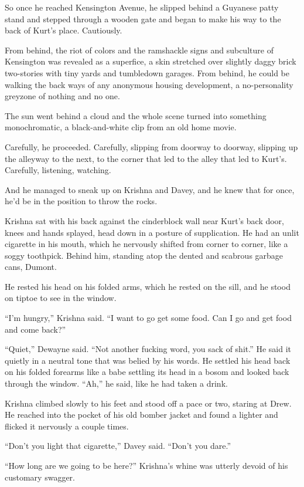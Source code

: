 \documentclass{article}
\begin{document}
So once he reached Kensington Avenue, he slipped behind a Guyanese
patty stand and stepped through a wooden gate and began to make his
way to the back of Kurt's place.  Cautiously.

From behind, the riot of colors and the ramshackle signs and
subculture of Kensington was revealed as a superfice, a skin stretched
over slightly daggy brick two-stories with tiny yards and tumbledown
garages.  From behind, he could be walking the back ways of any
anonymous housing development, a no-personality greyzone of nothing
and no one.

The sun went behind a cloud and the whole scene turned into something
monochromatic, a black-and-white clip from an old home movie.

Carefully, he proceeded.  Carefully, slipping from doorway to doorway,
slipping up the alleyway to the next, to the corner that led to the
alley that led to Kurt's.  Carefully, listening, watching.

And he managed to sneak up on Krishna and Davey, and he knew that for
once, he'd be in the position to throw the rocks.

Krishna sat with his back against the cinderblock wall near Kurt's
back door, knees and hands splayed, head down in a posture of
supplication.  He had an unlit cigarette in his mouth, which he
nervously shifted from corner to corner, like a soggy toothpick. 
Behind him, standing atop the dented and scabrous garbage cans,
Dumont.

He rested his head on his folded arms, which he rested on the sill,
and he stood on tiptoe to see in the window.

``I'm hungry,'' Krishna said.  ``I want to go get some food.  Can I go
and get food and come back?''

``Quiet,'' Dewayne said.  ``Not another fucking word, you sack of
shit.'' He said it quietly in a neutral tone that was belied by his
words.  He settled his head back on his folded forearms like a babe
settling its head in a bosom and looked back through the window. 
``Ah,'' he said, like he had taken a drink.

Krishna climbed slowly to his feet and stood off a pace or two,
staring at Drew.  He reached into the pocket of his old bomber jacket
and found a lighter and flicked it nervously a couple times.

``Don't you light that cigarette,'' Davey said.  ``Don't you dare.''

``How long are we going to be here?'' Krishna's whine was utterly
devoid of his customary swagger.
\end{document}
